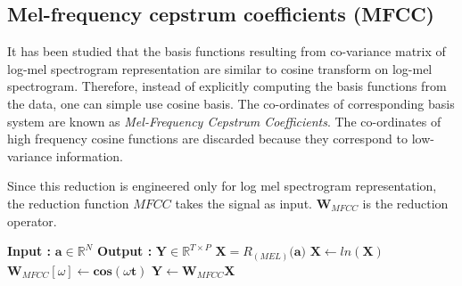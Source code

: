 \subsection{Mel-frequency cepstrum coefficients (MFCC)}
\label{mfcc}
It has been studied that the basis functions resulting from co-variance matrix of log-mel spectrogram representation are similar to cosine transform on log-mel spectrogram\cite{mfcc_pca}. Therefore, instead of explicitly computing the basis functions from the data, one can simple use cosine basis. The co-ordinates of corresponding basis system are known as \textit{Mel-Frequency Cepstrum Coefficients}. The co-ordinates of high frequency cosine functions are discarded because they correspond to low-variance information. 
\bigskip

\noindent Since this reduction is engineered only for log mel spectrogram representation, the reduction function $MFCC$ takes the signal as input. $\textbf{W}_{MFCC}$ is the reduction operator.

\begin{algorithm}
  \caption{$\textbf{Y}$ = $MFCC$($\textbf{a}$) }\label{MFCC}
  \begin{algorithmic}[1]
    \Statex \textbf{Input :} $\textbf{a} \in \mathbb{R}^{N}$
    \Statex \textbf{Output :} $\textbf{Y} \in \mathbb{R}^{T \times P}$
    \State $\textbf{X} = R_{(MEL)} \big( \textbf{a} \big) $  
    \State $\textbf{X} \leftarrow ln(\textbf{X})$
    \State $\textbf{W}_{MFCC}[ \omega ] \leftarrow \textbf{cos}( \omega \textbf{t})$  
    \EndFor
    \State $\textbf{Y} \leftarrow \textbf{W}_{MFCC}\textbf{X}$
  \end{algorithmic}
\end{algorithm}
 

